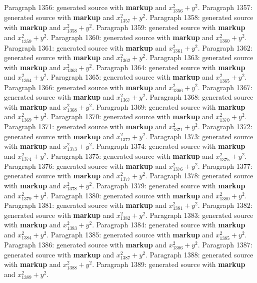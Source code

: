 \documentclass{article}
\begin{document}
Paragraph 1356: generated source with \textbf{markup} and $x_{1356}^2 + y^2$.
Paragraph 1357: generated source with \textbf{markup} and $x_{1357}^2 + y^2$.
Paragraph 1358: generated source with \textbf{markup} and $x_{1358}^2 + y^2$.
Paragraph 1359: generated source with \textbf{markup} and $x_{1359}^2 + y^2$.
Paragraph 1360: generated source with \textbf{markup} and $x_{1360}^2 + y^2$.
Paragraph 1361: generated source with \textbf{markup} and $x_{1361}^2 + y^2$.
Paragraph 1362: generated source with \textbf{markup} and $x_{1362}^2 + y^2$.
Paragraph 1363: generated source with \textbf{markup} and $x_{1363}^2 + y^2$.
Paragraph 1364: generated source with \textbf{markup} and $x_{1364}^2 + y^2$.
Paragraph 1365: generated source with \textbf{markup} and $x_{1365}^2 + y^2$.
Paragraph 1366: generated source with \textbf{markup} and $x_{1366}^2 + y^2$.
Paragraph 1367: generated source with \textbf{markup} and $x_{1367}^2 + y^2$.
Paragraph 1368: generated source with \textbf{markup} and $x_{1368}^2 + y^2$.
Paragraph 1369: generated source with \textbf{markup} and $x_{1369}^2 + y^2$.
Paragraph 1370: generated source with \textbf{markup} and $x_{1370}^2 + y^2$.
Paragraph 1371: generated source with \textbf{markup} and $x_{1371}^2 + y^2$.
Paragraph 1372: generated source with \textbf{markup} and $x_{1372}^2 + y^2$.
Paragraph 1373: generated source with \textbf{markup} and $x_{1373}^2 + y^2$.
Paragraph 1374: generated source with \textbf{markup} and $x_{1374}^2 + y^2$.
Paragraph 1375: generated source with \textbf{markup} and $x_{1375}^2 + y^2$.
Paragraph 1376: generated source with \textbf{markup} and $x_{1376}^2 + y^2$.
Paragraph 1377: generated source with \textbf{markup} and $x_{1377}^2 + y^2$.
Paragraph 1378: generated source with \textbf{markup} and $x_{1378}^2 + y^2$.
Paragraph 1379: generated source with \textbf{markup} and $x_{1379}^2 + y^2$.
Paragraph 1380: generated source with \textbf{markup} and $x_{1380}^2 + y^2$.
Paragraph 1381: generated source with \textbf{markup} and $x_{1381}^2 + y^2$.
Paragraph 1382: generated source with \textbf{markup} and $x_{1382}^2 + y^2$.
Paragraph 1383: generated source with \textbf{markup} and $x_{1383}^2 + y^2$.
Paragraph 1384: generated source with \textbf{markup} and $x_{1384}^2 + y^2$.
Paragraph 1385: generated source with \textbf{markup} and $x_{1385}^2 + y^2$.
Paragraph 1386: generated source with \textbf{markup} and $x_{1386}^2 + y^2$.
Paragraph 1387: generated source with \textbf{markup} and $x_{1387}^2 + y^2$.
Paragraph 1388: generated source with \textbf{markup} and $x_{1388}^2 + y^2$.
Paragraph 1389: generated source with \textbf{markup} and $x_{1389}^2 + y^2$.
\end{document}
